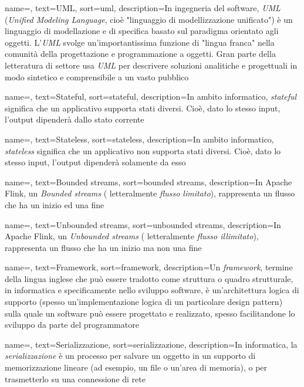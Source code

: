 {
    name=,
    text=UML,
    sort=uml,
    description={In ingegneria del software, \textit{UML} (\textit{Unified Modeling Language}, cioè "linguaggio di modellizzazione unificato") è un linguaggio di modellazione e di specifica basato sul paradigma orientato agli oggetti. L'\textit{UML} svolge un'importantissima funzione di "lingua franca" nella comunità della progettazione e programmazione a oggetti. Gran parte della letteratura di settore usa \textit{UML} per descrivere soluzioni analitiche e progettuali in modo sintetico e comprensibile a un vasto pubblico}
}

{
    name=,
    text=Stateful,
    sort=stateful,
    description={In ambito informatico, \emph{stateful} significa che un applicativo supporta stati diversi. Cioè, dato lo stesso input, l'output dipenderà dallo stato corrente}
}

{
    name=,
    text=Stateless,
    sort=stateless,
    description={In ambito informatico, \emph{stateless} significa che un applicativo non supporta stati diversi. Cioè, dato lo stesso input, l'output dipenderà solamente da esso}
}

{
    name=,
    text=Bounded streams,
    sort=bounded streams,
    description={In Apache Flink, un \textit{Bounded streams} ( letteralmente \textit{flusso limitato}), rappresenta un flusso che ha un inizio ed una fine}
}

{
    name=,
    text=Unbounded streams,
    sort=unbounded streams,
    description={In Apache Flink, un \textit{Unbounded streams} ( letteralmente \textit{flusso illimitato}), rappresenta un flusso che ha un inizio ma non una fine}
}

{
    name=,
    text=Framework,
    sort=framework,
    description={Un \textit{framework}, termine della lingua inglese che può essere tradotto come struttura o quadro strutturale, in informatica e specificamente nello sviluppo software, è un'architettura logica di supporto (spesso un'implementazione logica di un particolare design pattern) sulla quale un software può essere progettato e realizzato, spesso facilitandone lo sviluppo da parte del programmatore}
}


{
    name=,
    text=Serializzazione,
    sort=serializzazione,
    description={In informatica, la \textit{serializzazione} è un processo per salvare un oggetto in un supporto di memorizzazione lineare (ad esempio, un file o un'area di memoria), o per trasmetterlo su una connessione di rete}
}

